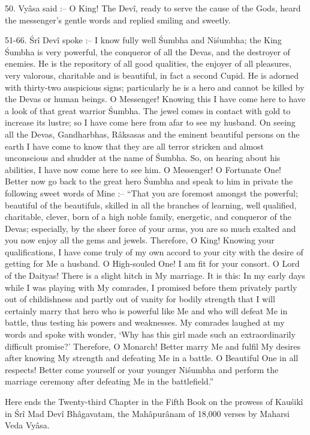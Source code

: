50. Vy\^asa said :-- O King! The Dev\^i, ready to serve the cause of the Gods, heard the messenger's gentle words and replied smiling and sweetly.

51-66. \'Sr\^i Dev\^i spoke :-- I know fully well \'Sumbha and Ni\'sumbha; the King \'Sumbha is very powerful, the conqueror of all the Devas, and the destroyer of enemies. He is the repository of all good qualities, the enjoyer of all pleasures, very valorous, charitable and is beautiful, in fact a second Cupid. He is adorned with thirty-two auspicious signs; particularly he is a hero and cannot be killed by the Devas or human beings. O Messenger! Knowing this I have come here to have a look of that great warrior \'Sumbha. The jewel comes in contact with gold to increase its lustre; so I have come here from afar to see my husband. On seeing all the Devas, Gandharbhas, R\^aksasas and the eminent beautiful persons on the earth I have come to know that they are all terror stricken and almost unconscious and shudder at the name of \'Sumbha. So, on hearing about his abilities, I have now come here to see him. O Messenger! O Fortunate One! Better now go back to the great hero \'Sumbha and speak to him in private the following sweet words of Mine :-- ``That you are foremost amongst the powerful; beautiful of the beautifuls, skilled in all the branches of learning, well qualified, charitable, clever, born of a high noble family, energetic, and conqueror of the Devas; especially, by the sheer force of your arms, you are so much exalted and you now enjoy all the gems and jewels. Therefore, O King! Knowing your qualifications, I have come truly of my own accord to your city with the desire of getting for Me a husband. O High-souled One! I am fit for your consort. O Lord of the Daityas! There is a slight hitch in My marriage. It is this: In my early days while I was playing with My comrades, I promised before them privately partly out of childishness and partly out of vanity for bodily strength that I will certainly marry that hero who is powerful like Me and who will defeat Me in battle, thus testing his powers and weaknesses. My comrades laughed at my words and spoke with wonder, ‘Why has this girl made such an extraordinarily difficult promise?' Therefore, O Monarch! Better marry Me and fulfil My desires after knowing My strength and defeating Me in a battle. O Beautiful One in all respects! Better come yourself or your younger Ni\'sumbha and perform the marriage ceremony after defeating Me in the battlefield.''

Here ends the Twenty-third Chapter in the Fifth Book on the prowess of Kau\'sik\^i in \'Sr\^i Mad Dev\^i Bh\^agavatam, the Mah\^apur\^anam of 18,000 verses by Maharsi Veda Vy\^asa.